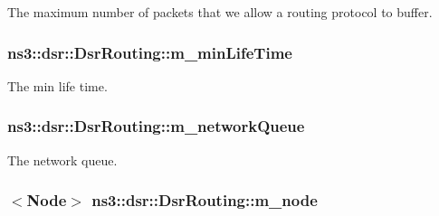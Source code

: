 The maximum number of packets that we allow a routing protocol to buffer. 

\subsubsection[{\texorpdfstring{m\+\_\+min\+Life\+Time}{m_minLifeTime}}]{ ns3\+::dsr\+::\+Dsr\+Routing\+::m\+\_\+min\+Life\+Time\hspace{0.3cm}{\ttfamily [private]}}\hypertarget{classns3_1_1dsr_1_1DsrRouting_ad7daf5388ab1104e535b27bb4eae1421}{}\label{classns3_1_1dsr_1_1DsrRouting_ad7daf5388ab1104e535b27bb4eae1421}


The min life time. 

\subsubsection[{\texorpdfstring{m\+\_\+network\+Queue}{m_networkQueue}}]{ ns3\+::dsr\+::\+Dsr\+Routing\+::m\+\_\+network\+Queue\hspace{0.3cm}{\ttfamily [private]}}\hypertarget{classns3_1_1dsr_1_1DsrRouting_a4a59e341508820cdc2e46bcc7f7db59c}{}\label{classns3_1_1dsr_1_1DsrRouting_a4a59e341508820cdc2e46bcc7f7db59c}


The network queue. 

\subsubsection[{\texorpdfstring{m\+\_\+node}{m_node}}]{$<${\bf Node}$>$ ns3\+::dsr\+::\+Dsr\+Routing\+::m\+\_\+node\hspace{0.3cm}{\ttfamily [private]}}\hypertarget{classns3_1_1dsr_1_1DsrRouting_ac27df0103a40973f0a3f78af0092c60d}{}\label{classns3_1_1dsr_1_1DsrRouting_ac27df0103a40973f0a3f78af0092c60d}


